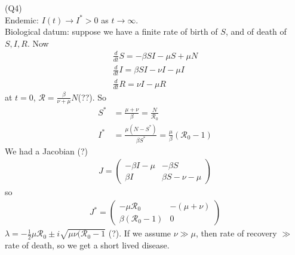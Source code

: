 \documentclass[a4paper]{article}
\begin{document}
(Q4)\\
Endemic: $I(t) \to I^* > 0$ as $t \to \infty$.\\
Biological datum: suppose we have a finite rate of birth of $S$, and of death of $S,I,R$. Now
\begin{equation*}
\begin{aligned}
\frac{d}{dt} S = -\beta SI - \mu S + \mu N\\
\frac{d}{dt} I = \beta SI - \nu I - \mu I\\
\frac{d}{dt} R = \nu I - \mu R
\end{aligned}
\end{equation*}
at $t=0$, $\mathcal{R} = \frac{\beta}{\nu+\mu}N$(??). So
\begin{equation*}
\begin{aligned}
S^* &= \frac{\mu+\nu}{\beta} = \frac{N}{\mathcal{R}_0}\\
I^* &= \frac{\mu(N-S^*)}{\beta S^*} = \frac{\mu}{\beta}(\mathcal{R}_0-1)
\end{aligned}
\end{equation*}
We had a Jacobian (?)
\begin{equation*}
\begin{aligned}
J=\begin{pmatrix}
-\beta I - \mu & -\beta S\\
\beta I & \beta S - \nu - \mu
\end{pmatrix}
\end{aligned}
\end{equation*}
so
\begin{equation*}
\begin{aligned}
J^*=\begin{pmatrix}
-\mu \mathcal{R}_0 & -(\mu+\nu)\\
\beta(\mathcal{R}_0-1) & 0
\end{pmatrix}
\end{aligned}
\end{equation*}
$\lambda = -\frac{1}{2} \mu \mathcal{R}_0 \pm i\sqrt{\mu\nu(\mathcal{R}_0 - 1}$ (?). If we assume $\nu \gg \mu$, then rate of recovery $\gg$ rate of death, so we get a short lived disease.
\end{document}
